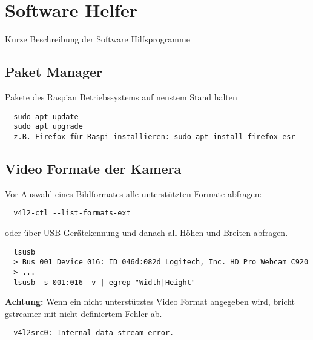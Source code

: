 \section{Software Helfer}
Kurze Beschreibung der Software Hilfsprogramme

\subsection{Paket Manager}
Pakete des Raspian Betriebssystems auf neustem Stand halten
\begin{verbatim}
  sudo apt update
  sudo apt upgrade
  z.B. Firefox für Raspi installieren: sudo apt install firefox-esr
\end{verbatim}

\subsection{Video Formate der Kamera}
Vor Auswahl eines Bildformates alle unterstützten Formate abfragen:
\begin{verbatim}
  v4l2-ctl --list-formats-ext
\end{verbatim}

oder über USB Gerätekennung und danach all Höhen und Breiten abfragen.
\begin{verbatim}
  lsusb
  > Bus 001 Device 016: ID 046d:082d Logitech, Inc. HD Pro Webcam C920
  > ...
  lsusb -s 001:016 -v | egrep "Width|Height"
\end{verbatim}

\textbf{Achtung:} Wenn ein nicht unterstütztes Video Format angegeben wird, bricht gstreamer mit nicht definiertem Fehler ab.
\begin{verbatim}
  v4l2src0: Internal data stream error.
\end{verbatim}


